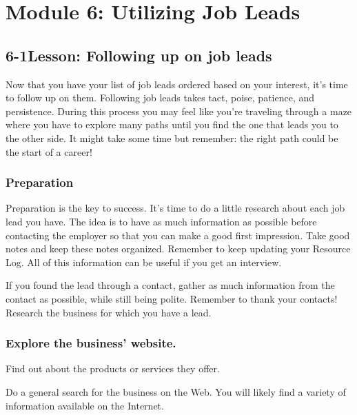 \pagebreak \section*{Module 6:	Utilizing Job Leads}
\noindent\makebox[\textwidth]{\rule{\linewidth}{0.4pt}}  \localtableofcontents
\noindent\makebox[\textwidth]{\rule{\linewidth}{0.4pt}}


\pagebreak \subsection*{6-1\quad Lesson: Following up on job leads}
Now that you have your list of job leads ordered based on your interest, it's time to follow up on them. Following job leads takes tact, poise, patience, and persistence. During this process you may feel like you're traveling through a maze where you have to explore many paths until you find the one that leads you to the other side. It might take some time but remember: the right path could be the start of a career!

\subsubsection*{Preparation}

Preparation is the key to success. It's time to do a little research about each job lead you have. The idea is to have as much information as possible before contacting the employer so that you can make a good first impression. Take good notes and keep these notes organized. Remember to keep updating your Resource Log. All of this information can be useful if you get an interview.

If you found the lead through a contact, gather as much information from the contact as possible, while still being polite. Remember to thank your contacts!
Research the business for which you have a lead.

\subsubsection*{Explore the business’ website.}
Find out about the products or services they offer.

Do a general search for the business on the Web. You will likely find a variety of information available on the Internet.

